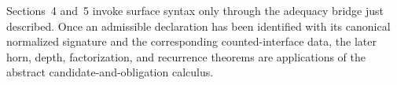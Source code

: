 \begin{remark}
Sections~4 and~5 invoke surface syntax only through the adequacy bridge just described.  Once
an admissible declaration has been identified with its canonical normalized signature and the
corresponding counted-interface data, the later horn, depth, factorization, and recurrence
theorems are applications of the abstract candidate-and-obligation calculus.
\end{remark}
